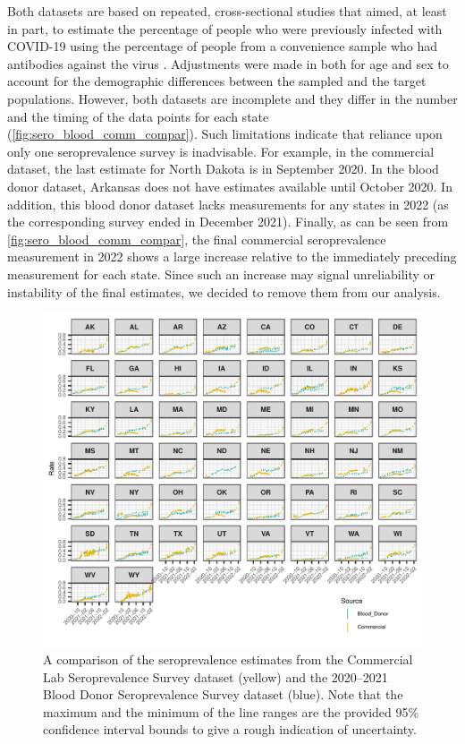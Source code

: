 \documentclass{article}
\begin{document}
Both datasets are based on repeated, cross-sectional studies that aimed, at
least in part, to estimate the percentage of people who were previously infected
with COVID-19 using the percentage of people from a convenience sample who had
antibodies against the virus \citep{bajema2021estimated, cdc2020data,
jones2021estimated}. Adjustments were made in both for age and sex to account
for the demographic differences between the sampled and the target populations.
However, both datasets are incomplete and they differ in the number and the
timing of the data points for each state (\autoref{fig:sero_blood_comm_compar}).
Such limitations indicate that reliance upon only one seroprevalence
survey is inadvisable.
For example, in the commercial dataset, the last estimate for North Dakota is in
September 2020. In the blood donor dataset, Arkansas does not have estimates
available until October 2020. In addition, this blood donor dataset lacks
measurements for any states in 2022 (as the corresponding survey ended in
December 2021). Finally, as can be seen from \autoref{fig:sero_blood_comm_compar},
the final commercial seroprevalence measurement in 2022 shows a large
increase relative to the immediately preceding measurement for each state. Since
such an increase may signal unreliability or instability of the final estimates,
we decided to remove them from our analysis. 

\begin{figure}[!tb]
\centering
    \includegraphics[width=.99\textwidth]{sero_blood_comm_compar.pdf}
    \caption{A comparison of the seroprevalence estimates from the Commercial
    Lab Seroprevalence Survey dataset (yellow) and the 2020--2021 Blood Donor 
    Seroprevalence Survey dataset (blue). Note that the maximum and the minimum
    of the line ranges are the provided 95\% confidence interval bounds to 
    give a rough indication of uncertainty.}
    \label{fig:sero_blood_comm_compar}
\end{figure}
\end{document}
